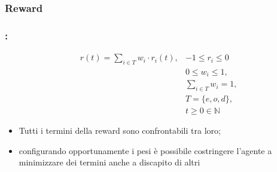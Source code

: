 \documentclass[compress]{beamer}
\begin{document}
\subsubsection{Reward}
\begin{frame}
    \frametitle{\subsecname: \subsubsecname}
    \begin{Definition}
        \begin{equation}
            \label{eq:reward}
            \begin{aligned}
                & r(t) = \sum_{i \in T} w_i \cdot r_i(t), & -1 \leq r_i \leq 0\\
                && 0 \leq w_i \leq 1, \\
                && \sum_{i \in T} w_i = 1, \\
                && T = \{e, o, d\},\\
                && t \geq 0 \in \mathbb{N}
            \end{aligned}
        \end{equation}
    \end{Definition}
    \only<+> {\begin{itemize}
        \item Tutti i termini della reward sono confrontabili tra loro;
        \item configurando opportunamente i pesi è possibile costringere l'agente
        a minimizzare dei termini anche a discapito di altri
    \end{itemize}}
\end{frame}
\end{document}
